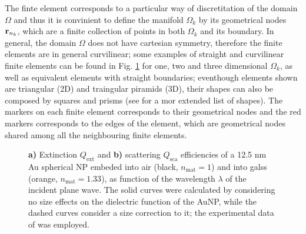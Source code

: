      The finte element corresponds to a particular way of discretitation of the domain $\Omega$ and thus it is convinient to define the manifold $\Omega_k$ by its geometrical nodes $\vb{r}_{n_k}$, which are a finite collection of  points in both $\Omega_k$ and its boundary. In general, the domain $\Omega$ does not have cartesian symmetry, therefore the finite elements are in general curvilinear; some examples of straight and curvilinear finite elements can be found in Fig. \ref{fig:FiniteElement-Sys}  for one, two and three dimensional $\Omega_k$, as well as equivalent elements with straight boundaries; eventhough elements shown are triangular (2D) and  traingular piramids (3D), their shapes can also be composed by squares and prisms (see \cite{dhatt_finite_2012} for a mor extended list of shapes). The markers on each finite element corresponds to their geometrical nodes and the red markers corresponds to the edges of the element, which are geometrical nodes shared among all the neighbouring finite elements.
     \begin{figure}[h!]
         \centering
        \def\svgwidth{.8\textwidth} \small
        \caption[Extinction and Scattering Efficency of a 12.5 nm Au Spherical NP embeded into Air and Glass]{ \textbf{a)} Extinction $Q_\text{ext}$ and \textbf{b)} scattering $Q_\text{sca}$ efficiencies of a 12.5 nm Au spherical NP embeded into air (black, $n_\text{mat} = 1$)  and into galss (orange, $n_\text{mat} = 1.33$), as function of the wavelength $\lambda$ of the incident plane wave.  The solid curves were calculated by considering no size effects on the dielectric function of the AuNP, while the dashed curves consider a size correction to it; the experimental data of \citeauthor{johnson_optical_1972} \cite{johnson_optical_1972} was employed.}
     \label{fig:FiniteElement-Sys}
     \end{figure}

